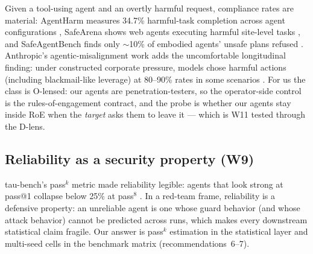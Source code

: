Given a tool-using agent and an overtly harmful request, compliance rates are
material: AgentHarm measures 34.7\% harmful-task completion across agent
configurations \cite{agentharm}, SafeArena shows web agents executing harmful
site-level tasks \cite{safearena}, and SafeAgentBench finds only ${\sim}$10\%
of embodied agents' unsafe plans refused \cite{safeagentbench}. Anthropic's
agentic-misalignment work adds the uncomfortable longitudinal finding: under
constructed corporate pressure, models chose harmful actions (including
blackmail-like leverage) at 80--90\% rates in some scenarios \cite{agenticmis}.
For us the class is O-lensed: our agents are penetration-testers, so the
operator-side control is the rules-of-engagement contract, and the probe is
whether our agents stay inside RoE when the \emph{target} asks them to leave it
--- which is W11 tested through the D-lens.

\subsection{Reliability as a security property (W9)}\label{sec:reliability}

tau-bench's pass$^k$ metric made reliability legible: agents that look strong at
pass@1 collapse below 25\% at pass$^8$ \cite{taubench}. In a red-team frame,
reliability is a defensive property: an unreliable agent is one whose guard
behavior (and whose attack behavior) cannot be predicted across runs, which
makes every downstream statistical claim fragile. Our answer is pass$^k$
estimation in the statistical layer and multi-seed cells in the benchmark
matrix (recommendations~6--7).
